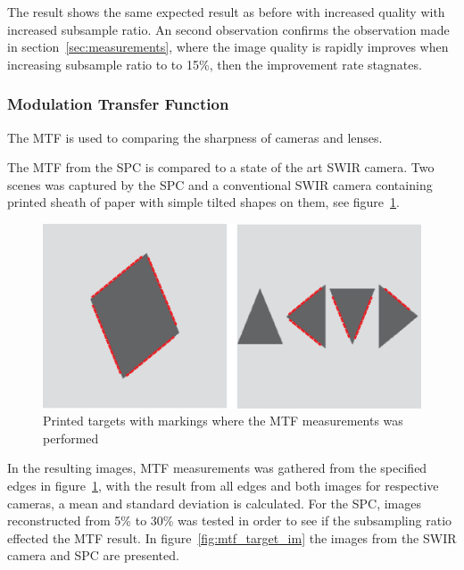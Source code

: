 The result shows the same expected result as before with increased quality with increased subsample ratio. An second observation confirms the observation made in section~\ref{sec:measurements}, where the image quality is rapidly improves when increasing subsample ratio to to 15\%, then the improvement rate stagnates. 



\subsubsection{Modulation Transfer Function}
The MTF is used to comparing the sharpness of cameras and lenses.  


The MTF from the SPC is compared to a state of the art SWIR camera. Two scenes was captured by the SPC and a conventional SWIR camera containing printed sheath of paper with simple tilted shapes on them, see figure~\ref{fig:mtf_target}. 



\begin{figure}[H]
    \centering
    \includegraphics[width=0.8\linewidth]{result/mtf/Target.eps}
    \caption{Printed targets with markings where the MTF measurements was performed}
    \label{fig:mtf_target}
\end{figure}

In the resulting images, MTF measurements was gathered from the specified edges in figure~\ref{fig:mtf_target}, with the result from all edges and both images for respective cameras, a mean and standard deviation is calculated. For the SPC, images reconstructed from 5\% to 30\% was tested in order to see if the subsampling ratio effected the MTF result. In figure~\ref{fig:mtf_target_im} the images from the SWIR camera and SPC are presented.

